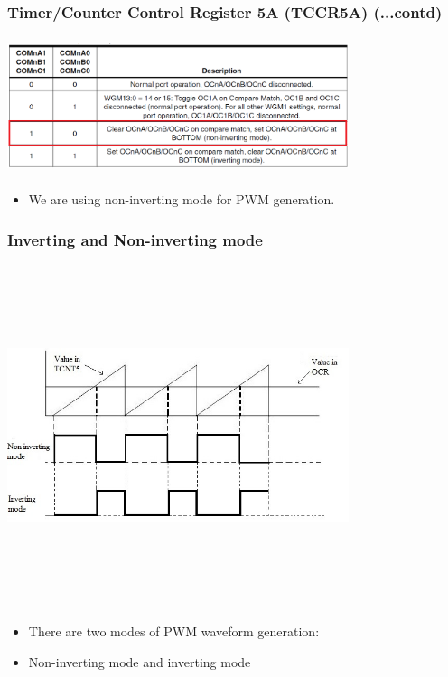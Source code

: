 \documentclass[table,10pt,red]{beamer}	%
\begin{document}
\begin{frame}
	\frametitle{Timer/Counter Control Register 5A (TCCR5A) (...contd)}
	\begin{center}
	\includegraphics[height=4cm, width=10cm]{com_bits}
    \end{center}
	\begin{itemize}
		\item <+-|alert@+> We are using non-inverting mode for PWM generation.
	\end{itemize}
	
\end{frame}	
\begin{frame}
	\frametitle{Inverting and Non-inverting mode}
	\centering
	\includegraphics[height=10cm, width=10cm, keepaspectratio]{pwm_output}
	\begin{itemize}
		\item <+-|alert@+> There are two modes of PWM waveform generation:
		\item <+-|alert@+> Non-inverting mode and inverting mode 
	\end{itemize}
\end{frame}	
\end{document}
